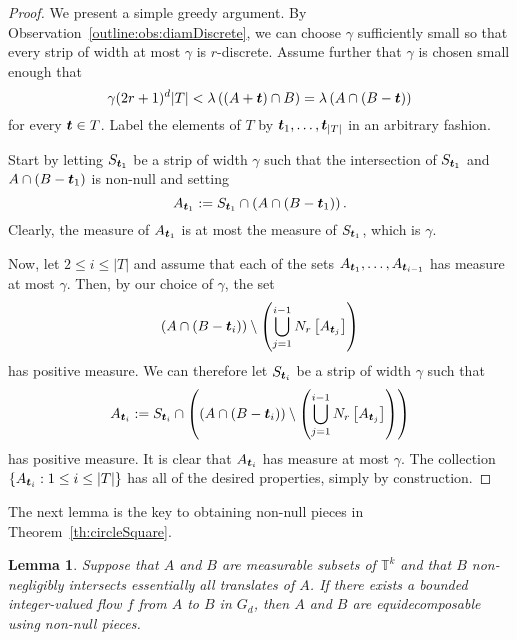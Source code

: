 \documentclass[12pt,a4paper]{amsart}
\numberwithin{equation}{section}
\newtheorem{lemma}[equation]{Lemma}
\theoremstyle{definition}
\begin{document}
\begin{proof}
We present a simple greedy argument. By Observation~\ref{outline:obs:diamDiscrete}, we can choose $\gamma$ sufficiently small so that every strip of width at most $\gamma$ is $r$-discrete. Assume further that $\gamma$ is chosen small enough that
\[\gamma(2r+1)^d|T| < \lambda\left((A+\boldsymbol{t})\cap B\right)=\lambda\left(A\cap (B-\boldsymbol{t})\right)\]
for every $\boldsymbol{t}\in T$. Label the elements of $T$ by $\boldsymbol{t}_1,\dots,\boldsymbol{t}_{|T|}$ in an arbitrary fashion.  

Start by letting $S_{\boldsymbol{t}_1}$ be a strip of width $\gamma$ such that the intersection of $S_{\boldsymbol{t}_1}$ and $A\cap (B-\boldsymbol{t}_1)$ is non-null and setting 
\[A_{\boldsymbol{t}_1}:=S_{\boldsymbol{t}_1}\cap \left(A\cap (B-\boldsymbol{t}_1)\right).\]
Clearly, the measure of $A_{\boldsymbol{t}_1}$ is at most the measure of $S_{\boldsymbol{t}_1}$, which is $\gamma$.  

Now, let $2\leq i\leq |T|$ and assume that each of the sets $A_{\boldsymbol{t}_1},\dots,A_{\boldsymbol{t}_{i-1}}$ has measure at most $\gamma$. Then, by our choice of $\gamma$, the set
\[\left(A\cap (B-\boldsymbol{t}_i)\right)\setminus \left(\bigcup_{j=1}^{i-1}N_r\left[A_{\boldsymbol{t}_j}\right]\right)\]
has positive measure. We can therefore let $S_{\boldsymbol{t}_i}$ be a strip of width $\gamma$ such that
\[A_{\boldsymbol{t}_i}:= S_{\boldsymbol{t}_i}\cap \left(\left(A\cap (B-\boldsymbol{t}_i)\right)\setminus \left(\bigcup_{j=1}^{i-1}N_r\left[A_{\boldsymbol{t}_j}\right]\right)\right)\]
has positive measure. It is clear that $A_{\boldsymbol{t}_i}$ has measure at most $\gamma$. The collection $\{A_{\boldsymbol{t}_i}:1\leq i\leq |T|\}$ has all of the desired properties, simply by construction. 
\end{proof}

The next lemma is the key to obtaining non-null pieces in Theorem~\ref{th:circleSquare}. 

\begin{lemma}
\label{lem:nonNull}
Suppose that $A$ and $B$ are measurable subsets of $\mathbb{T}^k$ and that $B$ non-negligibly intersects essentially all translates of $A$. If there exists a bounded integer-valued flow $f$ from $A$ to $B$ in $G_d$, then $A$ and $B$ are equidecomposable using non-null pieces. 
\end{lemma}
\end{document}
